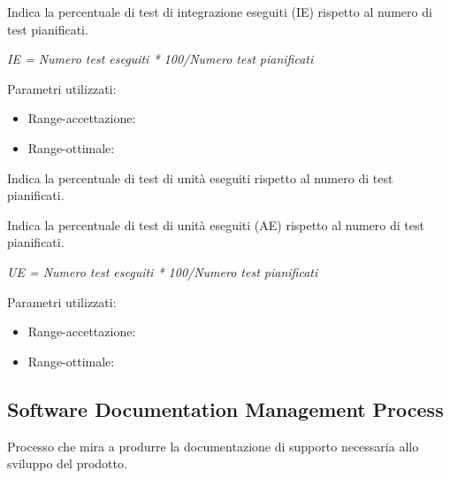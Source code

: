 \documentclass[a4paper,11pt]{article}
\begin{document}
Indica la percentuale di test di integrazione eseguiti (IE) rispetto al numero di test pianificati.
\begin{center}
\textit{IE = Numero test eseguiti * 100/Numero test pianificati}
\end{center}
Parametri utilizzati: 
\begin{itemize}
	\item Range-accettazione: \begin{math}[70\%]\end{math}
\item Range-ottimale: \begin{math}[60\%]\end{math}
	\end{itemize}

Indica la percentuale di test di unità eseguiti rispetto al numero di test pianificati.

Indica la percentuale di test di unità eseguiti (AE) rispetto al numero di test pianificati.
\begin{center}
\textit{UE = Numero test eseguiti * 100/Numero test pianificati}
\end{center}
Parametri utilizzati: 
\begin{itemize}
	\item Range-accettazione: \begin{math}[100\%]\end{math}
\item Range-ottimale: \begin{math}[100\%]\end{math}
	\end{itemize}

\subsection{Software Documentation Management Process}
Processo che mira a produrre la documentazione di supporto necessaria allo sviluppo del prodotto.
\end{document}
